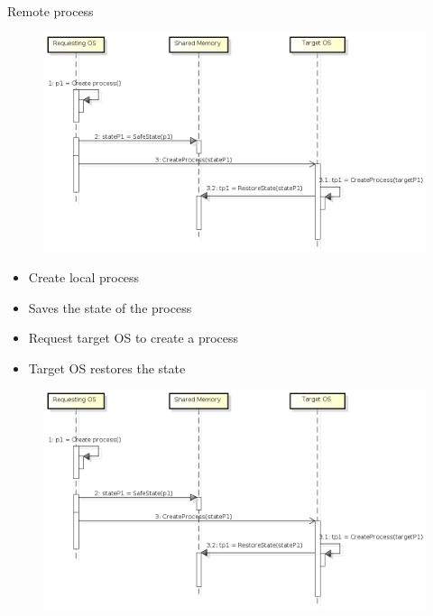 \documentclass{beamer}
\begin{document}
	\begin{frame}{Remote process}

	\begin{figure} [H]
			\centering
			\includegraphics[scale=0.3]{img/cerberus-process-creation}
	\end{figure}

	\begin{itemize}
	\item Create local process
	\item Saves the state of the process
	\item Request target OS to create a process
	\item Target OS restores the state
	\end{itemize}
	
	\end{frame}	

	\begin{frame}[plain]
		\begin{figure} [H]
			\centering
			\includegraphics[scale=0.46]{img/cerberus-process-creation}
		\end{figure}
	\end{frame}
	
\end{document}
